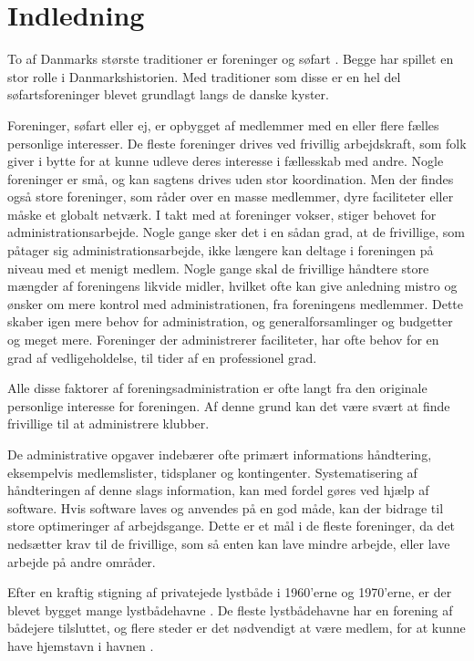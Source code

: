 \chapter{Indledning}

To af Danmarks største traditioner er foreninger og søfart \cite{moller1997}. Begge har spillet en stor rolle i Danmarkshistorien. Med traditioner som disse er en hel del søfartsforeninger blevet grundlagt langs de danske kyster. 

Foreninger, søfart eller ej, er opbygget af medlemmer med en eller flere fælles personlige interesser. De fleste foreninger drives ved frivillig arbejdskraft, som folk giver i bytte for at kunne udleve deres interesse i fællesskab med andre. Nogle foreninger er små, og kan sagtens drives uden stor koordination. Men der findes også store foreninger, som råder over en masse medlemmer, dyre faciliteter eller måske et globalt netværk. I takt med at foreninger vokser, stiger behovet for administrationsarbejde. Nogle gange sker det i en sådan grad, at de frivillige, som påtager sig administrationsarbejde, ikke længere kan deltage i foreningen på niveau med et menigt medlem. Nogle gange skal de frivillige håndtere store mængder af foreningens likvide midler, hvilket ofte kan give anledning mistro og ønsker om mere kontrol med administrationen, fra foreningens medlemmer. Dette skaber igen mere behov for administration, og generalforsamlinger og budgetter og meget mere. Foreninger der administrerer faciliteter, har ofte behov for en grad af vedligeholdelse, til tider af en professionel grad. 

Alle disse faktorer af foreningsadministration er ofte langt fra den originale personlige interesse for foreningen. Af denne grund kan det være svært at finde frivillige til at administrere klubber.

De administrative opgaver indebærer ofte primært informations håndtering, eksempelvis medlemslister, tidsplaner og kontingenter. Systematisering af håndteringen af denne slags information, kan med fordel gøres ved hjælp af software. Hvis software laves og anvendes på en god måde, kan der bidrage til store optimeringer af arbejdsgange. Dette er et mål i de fleste foreninger, da det nedsætter krav til de frivillige, som så enten kan lave mindre arbejde, eller lave arbejde på andre områder. 

Efter en kraftig stigning af privatejede lystbåde i 1960'erne og 1970'erne, er der blevet bygget mange lystbådehavne \cite{gyldendal_redaktionen_havn_2013}. De fleste lystbådehavne har en forening af bådejere tilsluttet, og flere steder er det nødvendigt at være medlem, for at kunne have hjemstavn i havnen \cite{int_vb_sl}.

